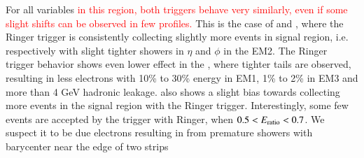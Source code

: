For all variables 
\textcolor{red}{in this region, both triggers behave very similarly, even if some slight shifts can be observed in few profiles.}
This is the case of \reta{} and \rphi{}, where the Ringer trigger is consistently collecting slightly more events in signal region, i.e. respectively with slight tighter showers in $\eta{}$ and $\phi{}$ in the EM2. The Ringer trigger behavior shows even lower effect in the \rhad{}, where tighter tails are observed, resulting in less electrons with 10\% to 30\% energy in EM1, 1\% to 2\% in EM3 and more than 4 GeV hadronic leakage. \eratio{} also shows a slight bias towards collecting more events in the signal region with the Ringer trigger. Interestingly, some few events are accepted by the trigger with Ringer, when $0.5<E_\text{ratio}{}<0.7$. We suspect it to be due electrons resulting in from premature showers with barycenter near the edge of two strips




